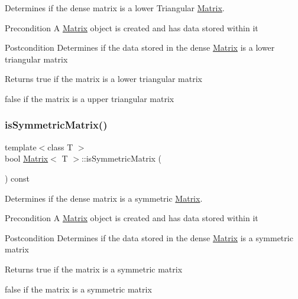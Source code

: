 Determines if the dense matrix is a lower Triangular \mbox{\hyperlink{class_matrix}{Matrix}}. 

\begin{DoxyPrecond}{Precondition}
A \mbox{\hyperlink{class_matrix}{Matrix}} object is created and has data stored within it 
\end{DoxyPrecond}
\begin{DoxyPostcond}{Postcondition}
Determines if the data stored in the dense \mbox{\hyperlink{class_matrix}{Matrix}} is a lower triangular matrix
\end{DoxyPostcond}
\begin{DoxyReturn}{Returns}
true if the matrix is a lower triangular matrix 

false if the matrix is a upper triangular matrix 
\end{DoxyReturn}
\mbox{\label{class_matrix_a4ce91f41c6396308570f5ba88f0f6b17}} 
\subsubsection{\texorpdfstring{isSymmetricMatrix()}{isSymmetricMatrix()}}
{\footnotesize\ttfamily template$<$class T $>$ \\
bool \mbox{\hyperlink{class_matrix}{Matrix}}$<$ T $>$\+::is\+Symmetric\+Matrix (\begin{DoxyParamCaption}{ }\end{DoxyParamCaption}) const}



Determines if the dense matrix is a symmetric \mbox{\hyperlink{class_matrix}{Matrix}}. 

\begin{DoxyPrecond}{Precondition}
A \mbox{\hyperlink{class_matrix}{Matrix}} object is created and has data stored within it 
\end{DoxyPrecond}
\begin{DoxyPostcond}{Postcondition}
Determines if the data stored in the dense \mbox{\hyperlink{class_matrix}{Matrix}} is a symmetric matrix
\end{DoxyPostcond}
\begin{DoxyReturn}{Returns}
true if the matrix is a symmetric matrix 

false if the matrix is a symmetric matrix 
\end{DoxyReturn}
\mbox{\label{class_matrix_a085b1801ea9d9b55eb5a3ca78bbda055}} 
